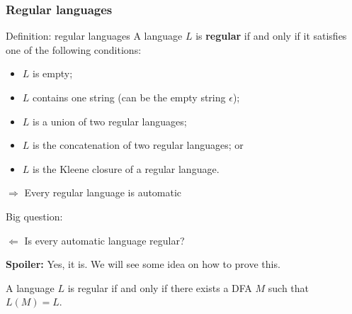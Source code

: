 \begin{frame}
  \frametitle{Regular languages}
  \begin{block}{Definition: regular languages}
    A language $L$ is {\color{red}\bf regular} if and only if it
    satisfies one of the following conditions:
    \begin{itemize}
    \item $L$ is empty;
    \item $L$ contains one string (can be the empty string $\epsilon$);
    \item $L$ is a union of two regular languages;
    \item $L$ is the concatenation of two regular languages; or
    \item $L$ is the Kleene closure of a regular language.
    \end{itemize}
  \end{block}
\end{frame}

\begin{frame}

  \begin{block}{$\Rightarrow$}
    Every regular language is automatic
  \end{block}

  Big question: \pause
  
  \begin{block}{$\Leftarrow$}
    Is every automatic language regular?
  \end{block}

  {\color{red} {\bf Spoiler:} \pause Yes, it is.  We will see some
    idea on how to prove this.  } \pause

  \begin{theorem}
    A language $L$ is regular if and only if there exists a DFA $M$
    such that $L(M)=L$.
  \end{theorem}
\end{frame}




